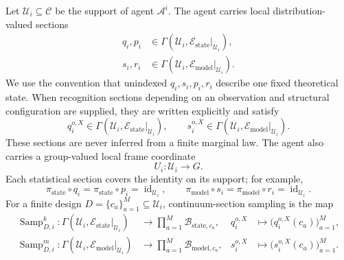 Let \(\mathcal U_i\subseteq\mathcal C\) be the support of agent \(\mathcal A^i\). The agent carries local distribution-valued sections
\begin{align}
q_i,p_i&\in\Gamma\left(\mathcal U_i,
\mathcal E_{\mathrm{state}}\vert_{\mathcal U_i}\right),
\label{eq:agent-state-sections}\\
s_i,r_i&\in\Gamma\left(\mathcal U_i,
\mathcal E_{\mathrm{model}}\vert_{\mathcal U_i}\right).
\label{eq:agent-model-sections}
\end{align}
We use the convention that unindexed \(q_i,s_i,p_i,r_i\) describe one fixed theoretical state. When recognition sections depending on an observation and structural configuration are supplied, they are written explicitly and satisfy
\begin{equation}
q_i^{o,X}\in\Gamma\left(\mathcal U_i,
\mathcal E_{\mathrm{state}}\vert_{\mathcal U_i}\right),
\qquad
s_i^{o,X}\in\Gamma\left(\mathcal U_i,
\mathcal E_{\mathrm{model}}\vert_{\mathcal U_i}\right).
\label{eq:observation-configuration-section-types}
\end{equation}
These sections are never inferred from a finite marginal law. The agent also carries a group-valued local frame coordinate
\begin{equation}
U_i:\mathcal U_i\longrightarrow G.
\label{eq:agent-frame-field}
\end{equation}
Each statistical section covers the identity on its support; for example,
\begin{equation}
\pi_{\mathrm{state}}\circ q_i
=\pi_{\mathrm{state}}\circ p_i
=\operatorname{id}_{\mathcal U_i},
\qquad
\pi_{\mathrm{model}}\circ s_i
=\pi_{\mathrm{model}}\circ r_i
=\operatorname{id}_{\mathcal U_i}.
\label{eq:agent-section-projections}
\end{equation}
For a finite design \(D=\{c_a\}_{a=1}^{M}\subseteq\mathcal U_i\), continuum-section sampling is the map
\begin{align}
\operatorname{Samp}_{D,i}^{k}:
\Gamma\left(\mathcal U_i,\mathcal E_{\mathrm{state}}\vert_{\mathcal U_i}\right)
&\longrightarrow\prod_{a=1}^{M}\mathcal B_{\mathrm{state},c_a},
&q_i^{o,X}&\longmapsto\bigl(q_i^{o,X}(c_a)\bigr)_{a=1}^{M},
\label{eq:continuum-state-section-sampling}\\
\operatorname{Samp}_{D,i}^{m}:
\Gamma\left(\mathcal U_i,\mathcal E_{\mathrm{model}}\vert_{\mathcal U_i}\right)
&\longrightarrow\prod_{a=1}^{M}\mathcal B_{\mathrm{model},c_a},
&s_i^{o,X}&\longmapsto\bigl(s_i^{o,X}(c_a)\bigr)_{a=1}^{M}.
\label{eq:continuum-model-section-sampling}
\end{align}
